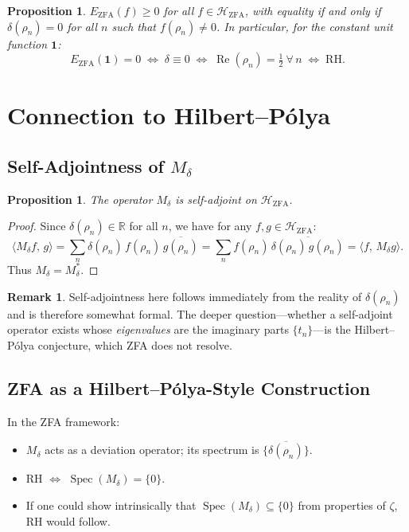 \documentclass[12pt]{article}
\newtheorem{proposition}[theorem]{Proposition}
\theoremstyle{definition}
\newtheorem{remark}[theorem]{Remark}
\newcommand{\HZFA}{\mathcal{H}_{\mathrm{ZFA}}}
\newcommand{\EZFA}{E_{\mathrm{ZFA}}}
\newcommand{\Mdelta}{M_{\delta}}
\begin{document}
\begin{proposition}
$\EZFA(f) \ge 0$ for all $f \in \HZFA$, with equality if and only if
$\delta(\rho_n) = 0$ for all $n$ such that $f(\rho_n) \neq 0$.
In particular, for the constant unit function $\mathbf{1}$:
\[
  \EZFA(\mathbf{1}) = 0
  \;\iff\;
  \delta \equiv 0
  \;\iff\;
  \operatorname{Re}(\rho_n) = \tfrac{1}{2}\ \forall\, n
  \;\iff\;
  \text{RH}.
\]
\end{proposition}

\section{Connection to Hilbert--P\'olya}

\subsection{Self-Adjointness of $M_\delta$}

\begin{proposition}\label{prop:sa}
The operator $\Mdelta$ is self-adjoint on $\HZFA$.
\end{proposition}

\begin{proof}
Since $\delta(\rho_n) \in \mathbb{R}$ for all $n$, we have for any
$f, g \in \HZFA$:
\[
  \langle \Mdelta f,\, g\rangle
  = \sum_n \delta(\rho_n)\,f(\rho_n)\,\overline{g(\rho_n)}
  = \sum_n f(\rho_n)\,\overline{\delta(\rho_n)\,g(\rho_n)}
  = \langle f,\, \Mdelta g\rangle.
\]
Thus $\Mdelta = \Mdelta^*$.
\end{proof}

\begin{remark}
Self-adjointness here follows immediately from the reality of
$\delta(\rho_n)$ and is therefore somewhat formal.
The deeper question---whether a self-adjoint operator exists whose
\emph{eigenvalues} are the imaginary parts $\{t_n\}$---is the
Hilbert--P\'olya conjecture, which ZFA does not resolve.
\end{remark}

\subsection{ZFA as a Hilbert--P\'olya-Style Construction}

In the ZFA framework:
\begin{itemize}
  \item $\Mdelta$ acts as a deviation operator; its spectrum is
        $\overline{\{\delta(\rho_n)\}}$.
  \item RH $\iff$ $\operatorname{Spec}(\Mdelta) = \{0\}$.
  \item If one could show intrinsically that
        $\operatorname{Spec}(\Mdelta) \subseteq \{0\}$ from properties
        of $\zeta$, RH would follow.
\end{itemize}
\end{document}
